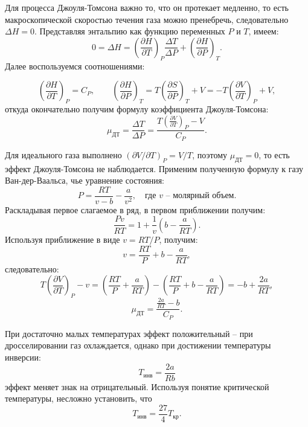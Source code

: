 \documentclass[a4paper,12pt]{article}
\newcommand\thpar[3]{\left(\frac{\partial #1}{\partial #2}\right)_{#3}}
\newcommand\mujt{\mu_{\text{ДТ}}}
\begin{document}
  Для процесса Джоуля-Томсона важно то, что он протекает медленно, то есть макроскопической скоростью течения газа можно пренебречь, следовательно $ \Delta H = 0 $. Представляя энтальпию как функцию переменных $P$ и $T$, имеем:
  \begin{equation}
    0 = \Delta H = \thpar{H}{T}{P} \frac{\Delta T}{\Delta P} + \thpar{H}{P}{T}.
  \end{equation}
  Далее воспользуемся соотношениями:

  \begin{equation}
    \thpar{H}{T}{P} = C_P, \qquad \thpar{H}{P}{T} = T \thpar{S}{P}{T} + V = -T \thpar{V}{T}{P} + V,
  \end{equation}
  откуда окончательно получим формулу коэффициента Джоуля-Томсона:
  \begin{equation}
    \mujt = \frac{\Delta T}{\Delta P} = \frac{T \thpar{V}{T}{P} - V}{C_P}.
  \end{equation}

  Для идеального газа выполнено $ (\partial V / \partial T)_P = V / T$, поэтому $\mu_{ДТ} = 0$, то есть эффект Джоуля-Томсона не наблюдается.
  Применим полученную формулу к газу Ван-дер-Ваальса, чье уравнение состояния:
  \begin{equation}
    P = \frac{RT}{v - b} - \frac{a}{v^2}, \quad \text{где $v$ -- молярный объем}.
  \end{equation}
  Раскладывая первое слагаемое в ряд, в первом приближении получим:
  \begin{equation}
    \frac{Pv}{RT} = 1 + \frac{1}{v}\left(b - \frac{a}{RT}\right).
  \end{equation}
  Используя приближение в виде $ v = RT / P $, получим:
  \begin{equation}
    v = \frac{RT}{P} + b - \frac{a}{RT},
  \end{equation}
  следовательно:
  \begin{equation}
    T \thpar{V}{T}{P} - v =  \left(\frac{RT}{P} + \frac{a}{RT}\right) - \left(\frac{RT}{P} + b - \frac{a}{RT}\right) = -b + \frac{2a}{RT},
  \end{equation}
  \begin{equation}
    \label{eq:mujt}
    \mujt = \frac{\frac{2a}{RT} - b}{C_P}.
  \end{equation}

  При достаточно малых температурах эффект положительный -- при дросселировании газ охлаждается, однако при достижении температуры инверсии:
  \begin{equation}
    T_{инв} = \frac{2a}{Rb}
  \end{equation}
  эффект меняет знак на отрицательный. Используя понятие критической температуры, несложно установить, что
  \begin{equation}
    T_{инв} = \frac{27}{4}T_{кр}.
  \end{equation}
\end{document}
